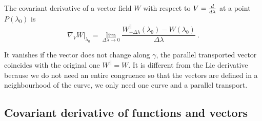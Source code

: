     \begin{definition}
        The covariant derivative of a vector field $W$ with respect to $V=\frac{d}{d\lambda}$ at a point $P(\lambda_0)$ is 
        \begin{equation*}
            \nabla_V W \vert_{\lambda_0} = \lim_{\Delta \lambda \rightarrow 0} \frac{W^{\parallel}_{- \Delta \lambda} (\lambda_0) - W(\lambda_0)}{\Delta \lambda} ~.
        \end{equation*}
    \end{definition}
    \noindent It vanishes if the vector does not change along $\gamma$, the parallel transported vector coincides with the original one $W^{\parallel} = W$. It is different from the Lie derivative because we do not need an entire congruence so that the vectors are defined in a neighbourhood of the curve, we only need one curve and a parallel transport.

\subsection{Covariant derivative of functions and vectors}

